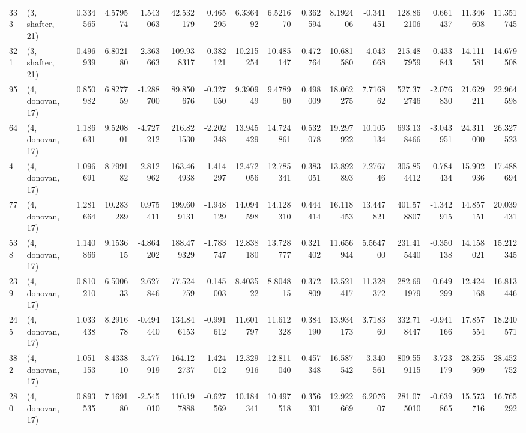 \begin{tabular}{llrrrrrrrrrrrrrr}
333 &  (3, shafter, 21) &   0.334565 &   4.579574 &   1.543063 &    42.532179 &   0.465295 &   6.336492 &   6.521670 &  0.362594 &   8.192406 &  -0.341451 &    128.862106 &   0.661437 &  11.346608 &   11.351745 \\
321 &  (3, shafter, 21) &   0.496939 &   6.802180 &   2.363663 &   109.938317 &  -0.382121 &  10.215254 &  10.485147 &  0.472764 &  10.681580 &  -4.043668 &    215.487959 &   0.433843 &  14.111581 &   14.679508 \\
95  &  (4, donovan, 17) &   0.850982 &   6.827759 &  -1.288700 &    89.850676 &  -0.327050 &   9.390949 &   9.478960 &  0.498009 &  18.062275 &   7.716862 &    527.372746 &  -2.076830 &  21.629211 &   22.964598 \\
64  &  (4, donovan, 17) &   1.186631 &   9.520801 &  -4.727212 &   216.821530 &  -2.202348 &  13.945429 &  14.724861 &  0.532078 &  19.297922 &  10.105134 &    693.138466 &  -3.043951 &  24.311000 &   26.327523 \\
4   &  (4, donovan, 17) &   1.096691 &   8.799182 &  -2.812962 &   163.464938 &  -1.414297 &  12.472056 &  12.785341 &  0.383051 &  13.892893 &   7.276746 &    305.854412 &  -0.784434 &  15.902936 &   17.488694 \\
77  &  (4, donovan, 17) &   1.281664 &  10.283289 &   0.975411 &   199.609131 &  -1.948129 &  14.094598 &  14.128310 &  0.444414 &  16.118453 &  13.447821 &    401.578807 &  -1.342915 &  14.857151 &   20.039431 \\
538 &  (4, donovan, 17) &   1.140866 &   9.153615 &  -4.864202 &   188.479329 &  -1.783747 &  12.838180 &  13.728777 &  0.321402 &  11.656944 &   5.564700 &    231.415440 &  -0.350138 &  14.158021 &   15.212345 \\
239 &  (4, donovan, 17) &   0.810210 &   6.500633 &  -2.627846 &    77.524759 &  -0.145003 &   8.403522 &   8.804815 &  0.372809 &  13.521417 &  11.328372 &    282.691979 &  -0.649299 &  12.424168 &   16.813446 \\
245 &  (4, donovan, 17) &   1.033438 &   8.291678 &  -0.494440 &   134.846153 &  -0.991612 &  11.601797 &  11.612328 &  0.384190 &  13.934173 &   3.718360 &    332.718447 &  -0.941166 &  17.857554 &   18.240571 \\
382 &  (4, donovan, 17) &   1.051153 &   8.433810 &  -3.477919 &   164.122737 &  -1.424012 &  12.329916 &  12.811040 &  0.457348 &  16.587542 &  -3.340561 &    809.559115 &  -3.723179 &  28.255969 &   28.452752 \\
280 &  (4, donovan, 17) &   0.893535 &   7.169180 &  -2.545010 &   110.197888 &  -0.627569 &  10.184341 &  10.497518 &  0.356301 &  12.922669 &   6.207607 &    281.075010 &  -0.639865 &  15.573716 &   16.765292 \\

\end{tabular}
